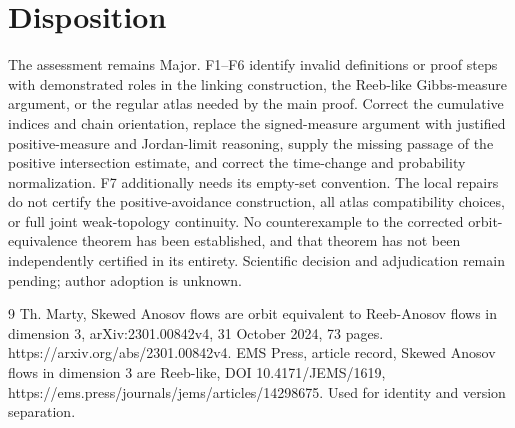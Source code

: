\documentclass[10pt]{article}
\begin{document}
\section*{Disposition}
The assessment remains Major. F1–F6 identify invalid definitions or proof steps with demonstrated roles in the linking construction, the Reeb-like Gibbs-measure argument, or the regular atlas needed by the main proof. Correct the cumulative indices and chain orientation, replace the signed-measure argument with justified positive-measure and Jordan-limit reasoning, supply the missing passage of the positive intersection estimate, and correct the time-change and probability normalization. F7 additionally needs its empty-set convention. The local repairs do not certify the positive-avoidance construction, all atlas compatibility choices, or full joint weak-topology continuity. No counterexample to the corrected orbit-equivalence theorem has been established, and that theorem has not been independently certified in its entirety. Scientific decision and adjudication remain pending; author adoption is unknown.\par
9 Th. Marty, Skewed Anosov flows are orbit equivalent to Reeb-Anosov flows in dimension 3, arXiv:2301.00842v4, 31 October 2024, 73 pages. https://arxiv.org/abs/2301.00842v4. EMS Press, article record, Skewed Anosov flows in dimension 3 are Reeb-like, DOI 10.4171/JEMS/1619, https://ems.press/journals/jems/articles/14298675. Used for identity and version separation.\par
\end{document}
